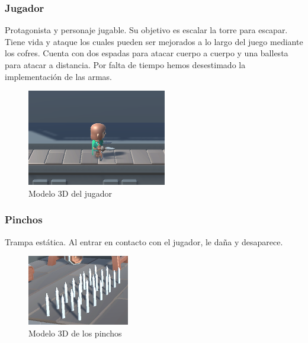 \documentclass{article}
\begin{document}
\subsubsection{Jugador}
    Protagonista y personaje jugable. 
    Su objetivo es escalar la torre para escapar.
    Tiene vida y ataque los cuales pueden ser mejorados a lo largo del juego mediante los cofres.
    Cuenta con dos espadas para atacar cuerpo a cuerpo y una ballesta para atacar a distancia.
    Por falta de tiempo hemos desestimado la implementación de las armas.

    \begin{figure}[h!]
        \centering
        \includegraphics[width=.7\textwidth]{img/2.png}
        \caption{Modelo 3D del jugador}
    \end{figure}

\subsubsection{Pinchos}
    Trampa estática. 
    Al entrar en contacto con el jugador, le daña y desaparece. 

    \begin{figure}[h!]
        \centering
        \includegraphics[width=.7\textwidth]{img/3.png}
        \caption{Modelo 3D de los pinchos}
    \end{figure}
\end{document}
